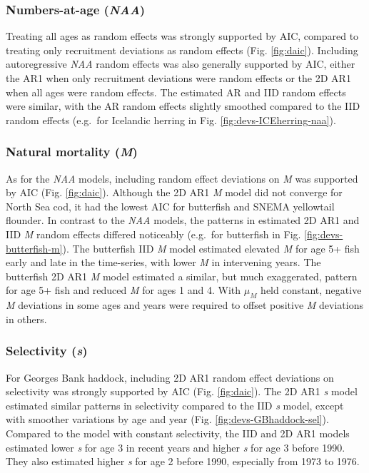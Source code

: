\documentclass[]{article}
\begin{document}
\hypertarget{numbers-at-age-naa-1}{%
\subsubsection{\texorpdfstring{Numbers-at-age
(\emph{NAA})}{Numbers-at-age (NAA)}}\label{numbers-at-age-naa-1}}

Treating all ages as random effects was strongly supported by AIC,
compared to treating only recruitment deviations as random effects (Fig.
\ref{fig:daic}). Including autoregressive \emph{NAA} random effects was
also generally supported by AIC, either the AR1 when only recruitment
deviations were random effects or the 2D AR1 when all ages were random
effects. The estimated AR and IID random effects were similar, with the
AR random effects slightly smoothed compared to the IID random effects
(e.g.~for Icelandic herring in Fig. \ref{fig:devs-ICEherring-naa}).

\hypertarget{natural-mortality-m-1}{%
\subsubsection{\texorpdfstring{Natural mortality
(\emph{M})}{Natural mortality (M)}}\label{natural-mortality-m-1}}

As for the \emph{NAA} models, including random effect deviations on
\emph{M} was supported by AIC (Fig. \ref{fig:daic}). Although the 2D AR1
\emph{M} model did not converge for North Sea cod, it had the lowest AIC
for butterfish and SNEMA yellowtail flounder. In contrast to the
\emph{NAA} models, the patterns in estimated 2D AR1 and IID \emph{M}
random effects differed noticeably (e.g.~for butterfish in Fig.
\ref{fig:devs-butterfish-m}). The butterfish IID \emph{M} model
estimated elevated \emph{M} for age 5+ fish early and late in the
time-series, with lower \emph{M} in intervening years. The butterfish 2D
AR1 \emph{M} model estimated a similar, but much exaggerated, pattern
for age 5+ fish and reduced \emph{M} for ages 1 and 4. With \(\mu_M\)
held constant, negative \emph{M} deviations in some ages and years were
required to offset positive \emph{M} deviations in others.

\hypertarget{selectivity-s-1}{%
\subsubsection{\texorpdfstring{Selectivity
(\emph{s})}{Selectivity (s)}}\label{selectivity-s-1}}

For Georges Bank haddock, including 2D AR1 random effect deviations on
selectivity was strongly supported by AIC (Fig. \ref{fig:daic}). The 2D
AR1 \emph{s} model estimated similar patterns in selectivity compared to
the IID \emph{s} model, except with smoother variations by age and year
(Fig. \ref{fig:devs-GBhaddock-sel}). Compared to the model with constant
selectivity, the IID and 2D AR1 models estimated lower \emph{s} for age
3 in recent years and higher \emph{s} for age 3 before 1990. They also
estimated higher \emph{s} for age 2 before 1990, especially from 1973 to
1976.
\end{document}
